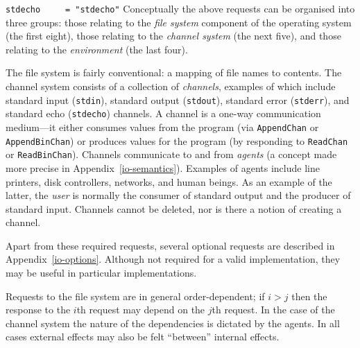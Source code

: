 \mbox{\tt stdecho\ \ \ \ \ =\ "stdecho"}
\eprog%
%
%
%
%
%
%
%
%
Conceptually the above requests can be organised into three groups:
those relating to the {\em file system} component of the
operating system (the first eight), those relating to the {\em channel
system} (the next five), and those relating to the
{\em environment} (the last four).  

The file system is fairly conventional: a mapping of file names to
contents.  The channel system consists of a collection of {\em
channels}, examples of which include standard input (\mbox{\tt stdin}),
standard output (\mbox{\tt stdout}), standard error (\mbox{\tt stderr}), and standard
echo (\mbox{\tt stdecho}) channels.  A channel is a one-way communication
medium---it either consumes values from the program (via \mbox{\tt AppendChan}
or \mbox{\tt AppendBinChan}) or produces values for the program (by responding
to \mbox{\tt ReadChan} or \mbox{\tt ReadBinChan}).  Channels communicate to and from
{\em agents} (a concept made more precise in
Appendix~\ref{io-semantics}).  Examples of agents include line printers, disk
controllers, networks, and human beings.  As an example of the latter,
the {\em user} is normally the consumer of standard output and the
producer of standard input.  Channels cannot be deleted, nor is there
a notion of creating a channel.

Apart from these required requests, several optional requests are
described in Appendix~\ref{io-options}.  Although not required for a
valid \Haskell{} implementation, they may be useful in
particular implementations.

Requests to the file system are in general order-dependent; if $i>j$
then the response to the $i$th request may depend on the $j$th
request.  In the case of the channel system the nature of the
dependencies is dictated by the agents.  In all cases external
effects may also be felt ``between'' internal effects.

